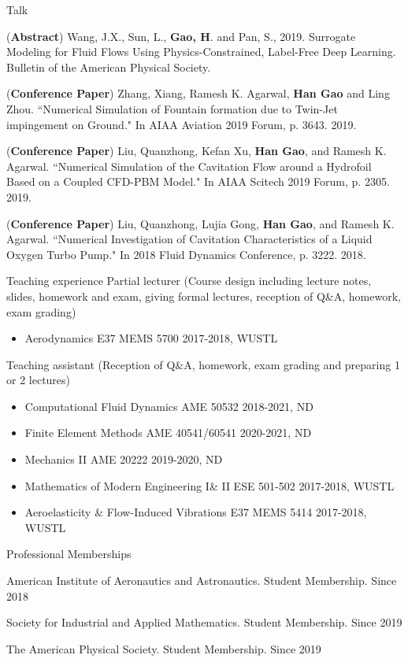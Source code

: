 \documentclass{resume} %
\begin{document}
\begin{rSection}{Talk}
\item (\textbf{\color{red}Abstract}) Wang, J.X., Sun, L., \textbf{Gao, H}. and Pan, S., 2019. Surrogate Modeling for Fluid Flows Using Physics-Constrained, Label-Free Deep Learning. Bulletin of the American Physical Society.
\item (\textbf{\color{red}Conference Paper}) Zhang, Xiang, Ramesh K. Agarwal, \textbf{Han Gao} and Ling Zhou. ``Numerical Simulation of Fountain formation due to Twin-Jet impingement on Ground." In AIAA Aviation 2019 Forum, p. 3643. 2019. 
\item (\textbf{\color{red}Conference Paper}) Liu, Quanzhong, Kefan Xu, \textbf{Han Gao}, and Ramesh K. Agarwal. ``Numerical Simulation of the Cavitation Flow around a Hydrofoil Based on a Coupled CFD-PBM Model." In AIAA Scitech 2019 Forum, p. 2305. 2019. 
\item (\textbf{\color{red}Conference Paper}) Liu, Quanzhong, Lujia Gong, \textbf{Han Gao}, and Ramesh K. Agarwal. ``Numerical Investigation of Cavitation Characteristics of a Liquid Oxygen Turbo Pump." In 2018 Fluid Dynamics Conference, p. 3222. 2018. 
\end{rSection}

\begin{rSection}{Teaching experience}
Partial lecturer (Course design including lecture notes, slides, homework and exam, giving formal lectures, reception of Q\&A, homework, exam grading)
\begin{itemize}
    \item Aerodynamics E37 MEMS 5700 \hfill 2017-2018, WUSTL
\end{itemize}

Teaching assistant (Reception of Q\&A, homework, exam grading and preparing 1 or 2 lectures)
\begin{itemize}
    \item Computational Fluid Dynamics AME 50532 \hfill 2018-2021, ND
    \item Finite Element Methods AME 40541/60541 \hfill 2020-2021, ND
    \item Mechanics II AME 20222 \hfill 2019-2020, ND
    \item Mathematics of Modern Engineering I\& II  ESE 501-502 \hfill 2017-2018, WUSTL
    \item Aeroelasticity \& Flow-Induced Vibrations E37 MEMS 5414 \hfill 2017-2018, WUSTL
\end{itemize}
\end{rSection}

\begin{rSection}{Professional Memberships}
\item American Institute of Aeronautics and Astronautics. Student Membership. Since 2018
\item Society for Industrial and Applied Mathematics. Student Membership. Since 2019
\item The American Physical Society. Student Membership. Since 2019
\end{rSection}
\end{document}
